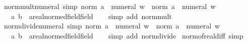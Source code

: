 \begin{isabellebody}
\endisatagproof
{\isafoldproof}%
%
\isadelimproof
\isanewline
%
\endisadelimproof
\isanewline
{}\isamarkupfalse%
\ norm{\isacharunderscore}{\kern0pt}mult{\isacharunderscore}{\kern0pt}numeral{}\ {\isacharbrackleft}{\kern0pt}simp{\isacharbrackright}{\kern0pt}{\isacharcolon}{\kern0pt}\ {\isachardoublequoteopen}norm\ {\isacharparenleft}{\kern0pt}a\ {\isacharasterisk}{\kern0pt}\ numeral\ w{\isacharparenright}{\kern0pt}\ {\isacharequal}{\kern0pt}\ norm\ a\ {\isacharasterisk}{\kern0pt}\ numeral\ w{\isachardoublequoteclose}\isanewline
\ \ \ a\ b\ {\isacharcolon}{\kern0pt}{\isacharcolon}{\kern0pt}\ {\isachardoublequoteopen}{\isacharprime}{\kern0pt}a{\isacharcolon}{\kern0pt}{\isacharcolon}{\kern0pt}{\isacharbraceleft}{\kern0pt}real{\isacharunderscore}{\kern0pt}normed{\isacharunderscore}{\kern0pt}field{\isacharcomma}{\kern0pt}field{\isacharbraceright}{\kern0pt}{\isachardoublequoteclose}\isanewline
%
\isadelimproof
\ \ %
\endisadelimproof
%
\isatagproof
{}\isamarkupfalse%
\ {\isacharparenleft}{\kern0pt}simp\ add{\isacharcolon}{\kern0pt}\ norm{\isacharunderscore}{\kern0pt}mult{\isacharparenright}{\kern0pt}%
\endisatagproof
{\isafoldproof}%
%
\isadelimproof
\isanewline
%
\endisadelimproof
\isanewline
{}\isamarkupfalse%
\ norm{\isacharunderscore}{\kern0pt}divide{\isacharunderscore}{\kern0pt}numeral\ {\isacharbrackleft}{\kern0pt}simp{\isacharbrackright}{\kern0pt}{\isacharcolon}{\kern0pt}\ {\isachardoublequoteopen}norm\ {\isacharparenleft}{\kern0pt}a\ {\isacharslash}{\kern0pt}\ numeral\ w{\isacharparenright}{\kern0pt}\ {\isacharequal}{\kern0pt}\ norm\ a\ {\isacharslash}{\kern0pt}\ numeral\ w{\isachardoublequoteclose}\isanewline
\ \ \ a\ b\ {\isacharcolon}{\kern0pt}{\isacharcolon}{\kern0pt}\ {\isachardoublequoteopen}{\isacharprime}{\kern0pt}a{\isacharcolon}{\kern0pt}{\isacharcolon}{\kern0pt}{\isacharbraceleft}{\kern0pt}real{\isacharunderscore}{\kern0pt}normed{\isacharunderscore}{\kern0pt}field{\isacharcomma}{\kern0pt}field{\isacharbraceright}{\kern0pt}{\isachardoublequoteclose}\isanewline
%
\isadelimproof
\ \ %
\endisadelimproof
%
\isatagproof
{}\isamarkupfalse%
\ {\isacharparenleft}{\kern0pt}simp\ add{\isacharcolon}{\kern0pt}\ norm{\isacharunderscore}{\kern0pt}divide{\isacharparenright}{\kern0pt}%
\endisatagproof
{\isafoldproof}%
%
\isadelimproof
\isanewline
%
\endisadelimproof
\isanewline
{}\isamarkupfalse%
\ norm{\isacharunderscore}{\kern0pt}of{\isacharunderscore}{\kern0pt}real{\isacharunderscore}{\kern0pt}diff\ {\isacharbrackleft}{\kern0pt}simp{\isacharbrackright}{\kern0pt}{\isacharcolon}{\kern0pt}\isanewline

\end{isabellebody}
